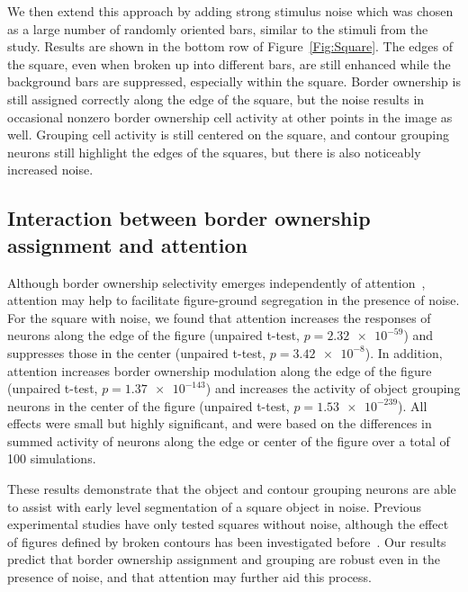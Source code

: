 We then extend this approach by adding strong stimulus noise which was
chosen as a large number of randomly oriented bars, similar to the
stimuli from the~\cite{Chen_etal14} study. Results are shown in
the bottom row of Figure~\ref{Fig:Square}. The edges of the
square, even when broken up into different bars, are still enhanced
while the background bars are suppressed, especially within the
square.  Border ownership is still assigned correctly along the edge
of the square, but the noise results in occasional nonzero border
ownership cell activity at other points in the image as well. Grouping
cell activity is still centered on the square, and contour grouping
neurons still highlight the edges of the squares, but there is also
noticeably increased noise.

\subsection{Interaction between border ownership assignment and attention} 
\label{sec:BOS-att}

Although border ownership selectivity emerges independently of
attention~\citep{Qiu_etal07}, attention may help to facilitate
figure-ground segregation in the presence of noise.  For the square
with noise, we found that attention increases the responses of neurons
along the edge of the figure (unpaired t-test, $p=\num{2.32e-59}$) and
suppresses those in the center (unpaired t-test,
$p=\num{3.42e-8}$). In addition, attention increases border ownership
modulation along the edge of the figure (unpaired t-test,
$p=\num{1.37e-143}$) and increases the activity of object grouping
neurons in the center of the figure (unpaired t-test,
$p=\num{1.53e-239}$). All effects were small but highly significant,
and were based on the differences in summed activity of neurons along
the edge or center of the figure over a total of 100 simulations.

These results demonstrate that the object and contour grouping neurons
are able to assist with early level segmentation of a square object in
noise.  Previous experimental studies have only tested squares without
noise, although the effect of figures defined by broken contours has
been investigated before~\citep{Zhang_vonderHeydt10}.  Our results predict
that border ownership assignment and grouping are robust even in the
presence of noise, and that attention may further aid this process.

